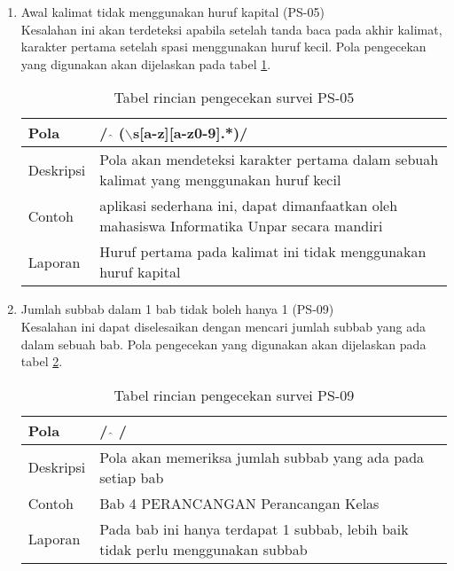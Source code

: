 \begin{enumerate}
	\item Awal kalimat tidak menggunakan huruf kapital (PS-05) \\
	Kesalahan ini akan terdeteksi apabila setelah tanda baca pada akhir kalimat, karakter pertama setelah spasi menggunakan huruf kecil. Pola pengecekan yang digunakan akan dijelaskan pada tabel \ref{tab:ps05}.
		
	\begin{table}[H]
		\renewcommand{\arraystretch}{1.5}
		\caption {Tabel rincian pengecekan survei PS-05} 
		\label{tab:ps05}
		\begin{center}
			\begin{tabular}{|p{3.5cm} |p{10.5cm}|}
			\hline 
			Pola & / $\hat{}$ ($\backslash$s[a-z][a-z0-9].*)/ \\ 
			\hline 
			Deskripsi & Pola akan mendeteksi karakter pertama dalam sebuah kalimat yang menggunakan huruf kecil   \\ 
			\hline 
			Contoh & aplikasi sederhana ini, dapat dimanfaatkan oleh mahasiswa Informatika Unpar secara mandiri \\ 
			\hline 
			Laporan & Huruf pertama pada kalimat ini tidak menggunakan huruf kapital \\ 
			\hline
			\end{tabular}
		\end{center}
	\end{table}
	
	\item Jumlah subbab dalam 1 bab tidak boleh hanya 1 (PS-09) \\
	Kesalahan ini dapat diselesaikan dengan mencari jumlah subbab yang ada dalam sebuah bab. Pola pengecekan yang digunakan akan dijelaskan pada tabel \ref{tab:ps09}.
		
	\begin{table}[H]
		\renewcommand{\arraystretch}{1.5}
		\caption {Tabel rincian pengecekan survei PS-09} 
		\label{tab:ps09}
		\begin{center}
			\begin{tabular}{|p{3.5cm} |p{10.5cm}|}
			\hline 
			Pola & / $\hat{}$ / \\ 
			\hline 
			Deskripsi & Pola akan memeriksa jumlah subbab yang ada pada setiap bab \\ 
			\hline 
			Contoh & Bab 4 \newline PERANCANGAN \newline \newline 4.1 Perancangan Kelas \\ 
			\hline 
			Laporan & Pada bab ini hanya terdapat 1 subbab, lebih baik tidak perlu menggunakan subbab \\ 
			\hline
			\end{tabular}
		\end{center}
	\end{table}
	

\end{enumerate}
